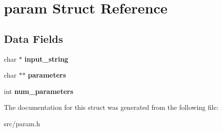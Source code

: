 \hypertarget{structparam}{}\section{param Struct Reference}
\label{structparam}
\subsection*{Data Fields}
\begin{DoxyCompactItemize}
\item 
\hypertarget{structparam_ae3246969b9eb1ac1fd081a353823fb8b}{}char $\ast$ {\bfseries input\+\_\+string}\label{structparam_ae3246969b9eb1ac1fd081a353823fb8b}

\item 
\hypertarget{structparam_a9bac80395f5f869a806dfa15a37f0f87}{}char $\ast$$\ast$ {\bfseries parameters}\label{structparam_a9bac80395f5f869a806dfa15a37f0f87}

\item 
\hypertarget{structparam_aa8da14eef0f9e8edc2c0bab308200867}{}int {\bfseries num\+\_\+parameters}\label{structparam_aa8da14eef0f9e8edc2c0bab308200867}

\end{DoxyCompactItemize}


The documentation for this struct was generated from the following file\+:\begin{DoxyCompactItemize}
\item 
src/param.\+h\end{DoxyCompactItemize}

